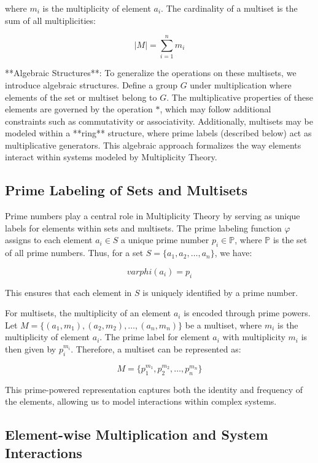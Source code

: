 \documentclass[12pt]{article}
\begin{document}
where \( m_i \) is the multiplicity of element \( a_i \). The cardinality of a multiset is the sum of all multiplicities:

$$|M| = \sum_{i=1}^{n} m_i$$

**Algebraic Structures**: To generalize the operations on these multisets, we introduce algebraic structures. Define a group \( G \) under multiplication where elements of the set or multiset belong to \( G \). The multiplicative properties of these elements are governed by the operation \( * \), which may follow additional constraints such as commutativity or associativity. Additionally, multisets may be modeled within a **ring** structure, where prime labels (described below) act as multiplicative generators. This algebraic approach formalizes the way elements interact within systems modeled by Multiplicity Theory.

\subsection{Prime Labeling of Sets and Multisets}

Prime numbers play a central role in Multiplicity Theory by serving as unique labels for elements within sets and multisets. The prime labeling function \( \varphi \) assigns to each element \( a_i \in S \) a unique prime number \( p_i \in \mathbb{P} \), where \( \mathbb{P} \) is the set of all prime numbers. Thus, for a set \( S = \{a_1, a_2, \dots, a_n\} \), we have:

$$varphi(a_i) = p_i$$

This ensures that each element in \( S \) is uniquely identified by a prime number.

For multisets, the multiplicity of an element \( a_i \) is encoded through prime powers. Let \( M = \{(a_1, m_1), (a_2, m_2), \dots, (a_n, m_n)\} \) be a multiset, where \( m_i \) is the multiplicity of element \( a_i \). The prime label for element \( a_i \) with multiplicity \( m_i \) is then given by \( p_i^{m_i} \). Therefore, a multiset can be represented as:

$$M = \{p_1^{m_1}, p_2^{m_2}, \dots, p_n^{m_n}\}$$

This prime-powered representation captures both the identity and frequency of the elements, allowing us to model interactions within complex systems.

\subsection{Element-wise Multiplication and System Interactions}
\end{document}
